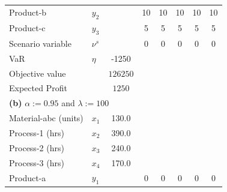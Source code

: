 \documentclass[7pt]{article}
\begin{document}
\begin{table}[h!]
\begin{tabular}{ll|c|ccccc}
        Product-b             & $y_2$                                      &                 & 10           & 10                & 10            & 10               & 10            \\
        Product-c             & $y_3$                                      &                 & 5            & 5                 & 5             & 5                & 5             \\
        Scenario variable     & $\nu^s$                                    &                 & 0            & 0                 & 0             & 0                & 0             \\
        VaR                   & $\eta$                                     & -1250           &              &                   &               &                  &               \\
        Objective value       &                                            & $126250$        &                                                                                     \\
        Expected Profit       &                                            & $1250$          &                                                                                     \\
        \midrule
        \multicolumn{8}{l}{\textbf{(b)} $\alpha := 0.95$ and $\lambda := 100$}                                                                                                     \\
        \midrule
        Material-abc (units)  & $x_1$                                      & 130.0           &              &                   &               &                                  \\
        Process-1 (hrs)       & $x_2$                                      & 390.0           &              &                   &               &                                  \\
        Process-2 (hrs)       & $x_3$                                      & 240.0           &              &                   &               &                                  \\
        Process-3 (hrs)       & $x_4$                                      & 170.0           &              &                   &               &                                  \\
        Product-a             & $y_1$                                      &                 & 0            & 0                 & 0             & 0                & 0             \\

\end{tabular}
\end{table}
\end{document}
